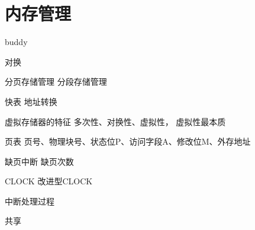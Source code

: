 \chapter{内存管理}
buddy

对换

分页存储管理
分段存储管理

快表
地址转换

虚拟存储器的特征
多次性、对换性、虚拟性，
虚拟性最本质

页表
页号、物理块号、状态位P、访问字段A、修改位M、外存地址

缺页中断
缺页次数

CLOCK
改进型CLOCK

中断处理过程

共享
